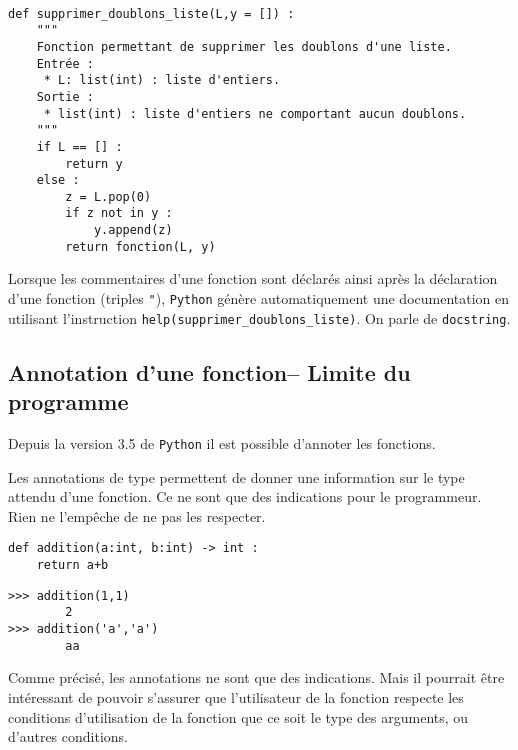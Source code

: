 \begin{exemple}~\\
\begin{lstlisting}
def supprimer_doublons_liste(L,y = []) :
    """
    Fonction permettant de supprimer les doublons d'une liste.
    Entrée : 
     * L: list(int) : liste d'entiers. 
    Sortie : 
     * list(int) : liste d'entiers ne comportant aucun doublons.
    """
    if L == [] : 
        return y
    else : 
        z = L.pop(0)
        if z not in y : 
            y.append(z)
        return fonction(L, y)
\end{lstlisting}

Lorsque les commentaires d'une fonction sont déclarés ainsi après la déclaration d'une fonction (triples \texttt{"}), \texttt{Python} génère automatiquement une documentation en utilisant l'instruction \texttt{help(supprimer\_doublons\_liste)}. On parle de \texttt{docstring}.
\end{exemple}


\subsection{Annotation d'une fonction-- Limite du programme}

Depuis la version 3.5 de \texttt{Python} il est possible d'annoter les fonctions. 
\begin{defi} Les annotations de type permettent de donner une information sur le type attendu d'une fonction. Ce ne sont que des indications pour le programmeur. Rien ne l'empêche de ne pas les respecter. 
\end{defi}

\begin{exemple}
\begin{minipage}[c]{.45\linewidth}
\begin{lstlisting}
def addition(a:int, b:int) -> int : 
    return a+b
\end{lstlisting}
\end{minipage} \hfill
\begin{minipage}[c]{.45\linewidth}
\begin{lstlisting}
>>> addition(1,1)
        2
>>> addition('a','a')
        aa
\end{lstlisting}
\end{minipage} 

\end{exemple}

Comme précisé, les annotations ne sont que des indications. Mais il pourrait être intéressant de pouvoir s'assurer que l'utilisateur de la fonction respecte les conditions d'utilisation de la fonction que ce soit le type des arguments, ou d'autres conditions.

